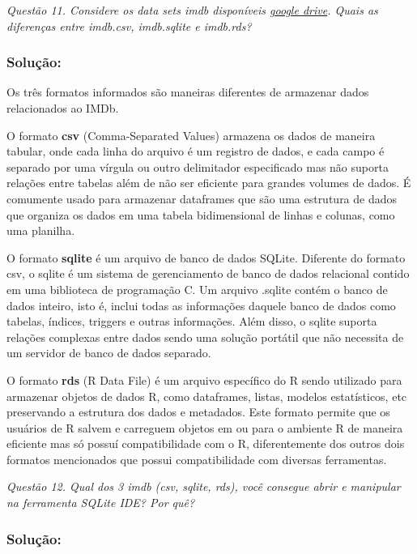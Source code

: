 \documentclass[
]{article}
\begin{document}
\emph{Questão 11. Considere os data sets imdb disponíveis
\href{https://drive.google.com/drive/folders/1CkVbB02B1Rltl2FiEtgzxRxHN4nnqLGE?usp=drive_link}{google
drive}. Quais as diferenças entre imdb.csv, imdb.sqlite e imdb.rds?}

\subsubsection{Solução:}\label{soluuxe7uxe3o-10}

Os três formatos informados são maneiras diferentes de armazenar dados
relacionados ao IMDb.

O formato \textbf{csv} (Comma-Separated Values) armazena os dados de
maneira tabular, onde cada linha do arquivo é um registro de dados, e
cada campo é separado por uma vírgula ou outro delimitador especificado
mas não suporta relações entre tabelas além de não ser eficiente para
grandes volumes de dados. É comumente usado para armazenar dataframes
que são uma estrutura de dados que organiza os dados em uma tabela
bidimensional de linhas e colunas, como uma planilha.

O formato \textbf{sqlite} é um arquivo de banco de dados SQLite.
Diferente do formato csv, o sqlite é um sistema de gerenciamento de
banco de dados relacional contido em uma biblioteca de programação C. Um
arquivo .sqlite contém o banco de dados inteiro, isto é, inclui todas as
informações daquele banco de dados como tabelas, índices, triggers e
outras informações. Além disso, o sqlite suporta relações complexas
entre dados sendo uma solução portátil que não necessita de um servidor
de banco de dados separado.

O formato \textbf{rds} (R Data File) é um arquivo específico do R sendo
utilizado para armazenar objetos de dados R, como dataframes, listas,
modelos estatísticos, etc preservando a estrutura dos dados e metadados.
Este formato permite que os usuários de R salvem e carreguem objetos em
ou para o ambiente R de maneira eficiente mas só possuí compatibilidade
com o R, diferentemente dos outros dois formatos mencionados que possui
compatibilidade com diversas ferramentas.

\emph{Questão 12. Qual dos 3 imdb (csv, sqlite, rds), você consegue
abrir e manipular na ferramenta SQLite IDE? Por quê?}

\subsubsection{Solução:}\label{soluuxe7uxe3o-11}
\end{document}
